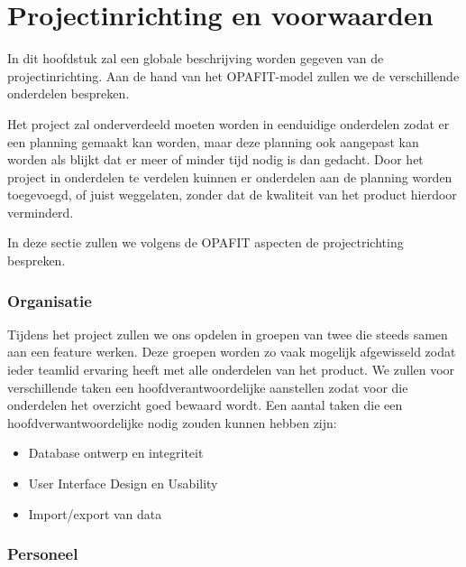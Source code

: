 \section{Projectinrichting en voorwaarden}
\label{projectinrichting}

In dit hoofdstuk zal een globale beschrijving worden gegeven van de projectinrichting. Aan de hand van het OPAFIT-model zullen we de verschillende onderdelen bespreken. 

Het project zal onderverdeeld moeten worden in eenduidige onderdelen zodat er een planning gemaakt kan worden,
maar deze planning ook aangepast kan worden als blijkt dat er meer of minder tijd nodig is dan gedacht.
Door het project in onderdelen te verdelen kuinnen er onderdelen aan de planning worden toegevoegd,
of juist weggelaten, zonder dat de kwaliteit van het product hierdoor verminderd.


In deze sectie zullen we volgens de OPAFIT aspecten de projectrichting bespreken.

\subsubsection{Organisatie}

Tijdens het project zullen we ons opdelen in groepen van twee die steeds samen aan een feature werken.
Deze groepen worden zo vaak mogelijk afgewisseld zodat ieder teamlid ervaring heeft met alle onderdelen van het product.
We zullen voor verschillende taken een hoofdverantwoordelijke aanstellen zodat voor die onderdelen het overzicht goed bewaard wordt.
Een aantal taken die een hoofdverwantwoordelijke nodig zouden kunnen hebben zijn:
\begin{itemize}
    \item Database ontwerp en integriteit
    \item User Interface Design en Usability
    \item Import/export van data
\end{itemize}

\subsubsection{Personeel}

